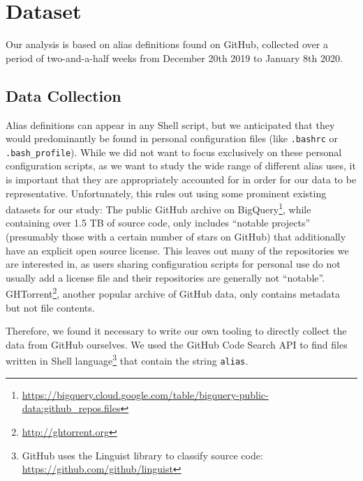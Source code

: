 \section{Dataset}

Our analysis is based on  alias definitions found on GitHub, collected over a period of two-and-a-half weeks from December 20th 2019 to January 8th 2020.

\subsection{Data Collection}

Alias definitions can appear in any Shell script, but we anticipated that they would predominantly be found in personal configuration files (like \verb|.bashrc| or \verb|.bash_profile|).
While we did not want to focus exclusively on these personal configuration scripts, as we want to study the wide range of different alias uses, it is important that they are appropriately accounted for in order for our data to be representative.
Unfortunately, this rules out using some prominent existing datasets for our study:
The public GitHub archive on BigQuery\footnote{\url{https://bigquery.cloud.google.com/table/bigquery-public-data:github_repos.files}}, while containing over 1.5 TB of source code, only includes ``notable projects'' (presumably those with a certain number of stars on GitHub) that additionally have an explicit open source license. 
This leaves out many of the repositories we are interested in, as users sharing configuration scripts for personal use do not usually add a license file and their repositories are generally not ``notable''.
GHTorrent\footnote{\url{http://ghtorrent.org}}, another popular archive of GitHub data, only contains metadata but not file contents.

Therefore, we found it necessary to write our own tooling to directly collect the data from GitHub ourselves.
We used the GitHub Code Search API to find files written in Shell language\footnote{GitHub uses the Linguist library to classify source code: \url{https://github.com/github/linguist}} that contain the string \verb|alias|.

